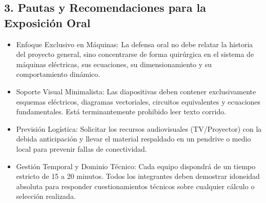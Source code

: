 \documentclass[../main]{subfiles}
\begin{document}
\subsection{3. Pautas y Recomendaciones para la Exposición Oral}
\begin{itemize}
  \item Enfoque Exclusivo en Máquinas: La defensa oral no debe
    relatar la historia del proyecto general, sino concentrarse de
    forma quirúrgica en el sistema de máquinas eléctricas, sus
    ecuaciones, su dimensionamiento y su comportamiento dinámico.
  \item Soporte Visual Minimalista: Las diapositivas deben contener
    exclusivamente esquemas eléctricos, diagramas vectoriales,
    circuitos equivalentes y ecuaciones fundamentales. Está
    terminantemente prohibido leer texto corrido.
  \item Previsión Logística: Solicitar los recursos audiovisuales
    (TV/Proyector) con la debida anticipación y llevar el material
    respaldado en un pendrive o medio local para prevenir fallas de
    conectividad.
  \item Gestión Temporal y Dominio Técnico: Cada equipo dispondrá de
    un tiempo estricto de 15 a 20 minutos. Todos los integrantes
    deben demostrar idoneidad absoluta para responder
    cuestionamientos técnicos sobre cualquier cálculo o selección realizada.
\end{itemize}
\end{document}
